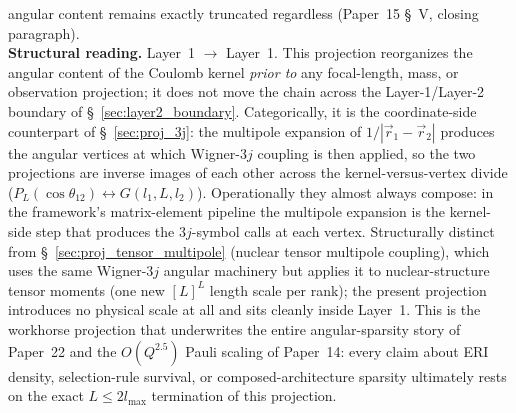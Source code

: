 angular content remains exactly truncated regardless
(Paper~15 \S~V, closing paragraph).\\
\textbf{Structural reading.}  Layer~1 $\to$ Layer~1.  This projection
reorganizes the angular content of the Coulomb kernel \emph{prior to}
any focal-length, mass, or observation projection; it does not move
the chain across the Layer-1/Layer-2 boundary of
\S~\ref{sec:layer2_boundary}.  Categorically, it is the coordinate-side
counterpart of \S~\ref{sec:proj_3j}: the multipole expansion of
$1/|\vec{r}_1 - \vec{r}_2|$ produces the angular vertices at which
Wigner-$3j$ coupling is then applied, so the two projections are
inverse images of each other across the kernel-versus-vertex divide
($P_L(\cos\theta_{12}) \leftrightarrow G(l_1, L, l_2)$).  Operationally
they almost always compose: in the framework's matrix-element pipeline
the multipole expansion is the kernel-side step that produces the
$3j$-symbol calls at each vertex.  Structurally distinct from
\S~\ref{sec:proj_tensor_multipole} (nuclear tensor multipole coupling),
which uses the same Wigner-$3j$ angular machinery but applies it to
nuclear-structure tensor moments (one new $[L]^L$ length scale per
rank); the present projection introduces no physical scale at all and
sits cleanly inside Layer~1.  This is the workhorse projection that
underwrites the entire angular-sparsity story of Paper~22 and the
$O(Q^{2.5})$ Pauli scaling of Paper~14: every claim about ERI density,
selection-rule survival, or composed-architecture sparsity ultimately
rests on the exact $L \leq 2 l_\text{max}$ termination of this
projection.

